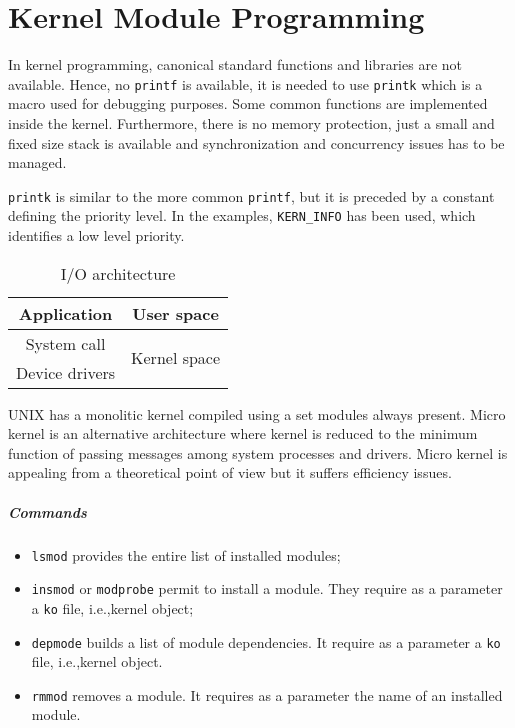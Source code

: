 \chapter{Kernel Module Programming}
In kernel programming, canonical standard functions and libraries are not available. Hence, no \texttt{printf} is available, it is needed to use \texttt{printk} which is a macro used for debugging purposes. Some common functions are implemented inside the kernel. Furthermore, there is no memory protection, just a small and fixed size stack is available and synchronization and concurrency issues has to be managed.

\texttt{printk} is similar to the more common \texttt{printf}, but it is preceded by a constant defining the priority level. In the examples, \texttt{KERN\_INFO} has been used, which identifies a low level priority.

\begin{table}
\centering
\begin{tabular}{|c|c|}
\hline 
Application & User space \\
\hline 
System call & \multirow{2}{*}{Kernel space} \\
Device drivers & \\
\hline 
\end{tabular}
\caption{I/O architecture}
\label{tab:io_architecture}
\end{table} 

UNIX has a monolitic kernel compiled using a set modules always present. Micro kernel is an alternative architecture where kernel is reduced to the minimum function of passing messages among system processes and drivers. Micro kernel is appealing from a theoretical point of view but it suffers efficiency issues.

\paragraph{Commands}
\begin{itemize}
\item \texttt{lsmod} provides the entire list of installed modules;
\item \texttt{insmod} or \texttt{modprobe} permit to install a module. They require as a parameter a \texttt{ko} file, i.e.,\@ kernel object;
\item \texttt{depmode} builds a list of module dependencies. It require as a parameter a \texttt{ko} file, i.e.,\@ kernel object.
\item \texttt{rmmod} removes a module.  It requires as a parameter the name of an installed module.
\end{itemize}

